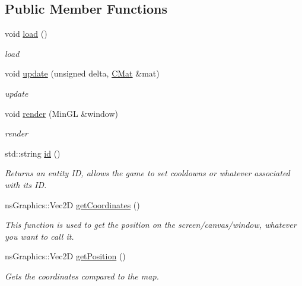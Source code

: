 \subsection*{Public Member Functions}
\begin{DoxyCompactItemize}
\item 
void \hyperlink{structns_game_1_1_entity_ae0aa595447b5f3d2c0b80fb99305c56e}{load} ()
\begin{DoxyCompactList}\small\item\em load \end{DoxyCompactList}\item 
void \hyperlink{structns_game_1_1_entity_af1da5da20798e01469c4a438d0b4174c}{update} (unsigned delta, \hyperlink{type_8h_a64a592133575ccebb1b36453acbec02b}{C\+Mat} \&mat)
\begin{DoxyCompactList}\small\item\em update \end{DoxyCompactList}\item 
void \hyperlink{structns_game_1_1_entity_a4663cc85381acc9aaac120a85b6f24d0}{render} (Min\+GL \&window)
\begin{DoxyCompactList}\small\item\em render \end{DoxyCompactList}\item 
std\+::string \hyperlink{structns_game_1_1_entity_aa0057e4e5b73cc0187602c3180347a3a}{id} ()
\begin{DoxyCompactList}\small\item\em Returns an entity ID, allows the game to set cooldowns or whatever associated with its ID. \end{DoxyCompactList}\item 
ns\+Graphics\+::\+Vec2D \hyperlink{structns_game_1_1_entity_a727ed96ea0a27b7232e701ed0ba6d3a4}{get\+Coordinates} ()
\begin{DoxyCompactList}\small\item\em This function is used to get the position on the screen/canvas/window, whatever you want to call it. \end{DoxyCompactList}\item 
ns\+Graphics\+::\+Vec2D \hyperlink{structns_game_1_1_entity_ab7fc1631346d2c643161d229dd653edd}{get\+Position} ()
\begin{DoxyCompactList}\small\item\em Gets the coordinates compared to the map. \end{DoxyCompactList}\item 

\end{DoxyCompactItemize}

